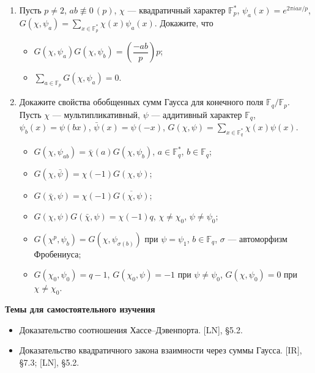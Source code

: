\documentclass[a4paper, 11pt]{article}
\begin{document}
\begin{enumerate}[topsep=0pt]
    \item Пусть $p\neq 2$, $ab\not\equiv 0\,(p)$, $\chi$ --- квадратичный характер $\mathbb{F}_p^*$, $\psi_a(x)=e^{2\pi i ax/p}$, $G(\chi,\psi_a)=\sum_{x\in\mathbb{F}_p^*}\chi(x)\psi_a(x)$. Докажите, что
    \begin{itemize}[topsep=0pt]
        \item $G(\chi,\psi_a)G(\chi,\psi_b) = \left(\dfrac{-ab}{p}\right) p$; %
        \item $\sum_{a\in\mathbb{F}_p} G(\chi,\psi_a)=0$. %
    \end{itemize}
    \item Докажите свойства обобщенных сумм Гаусса для конечного поля $\mathbb{F}_q/\mathbb{F}_p$. Пусть $\chi$ --- мультипликативный, $\psi$ --- аддитивный характер $\mathbb{F}_q$, $\psi_b(x)=\psi(bx)$, $\bar\psi(x)=\psi(-x)$, $G(\chi,\psi)=\sum_{x\in\mathbb{F}_q^*}\chi(x)\psi(x)$.
    \begin{itemize}[topsep=0pt]
        \item $G(\chi,\psi_{ab})=\bar{\chi}(a) G(\chi, \psi_b)$, $a\in\mathbb{F}_q^*$, $b\in \mathbb{F}_q$;
        \item $G(\chi,\bar{\psi}) = \chi(-1) G(\chi,\psi)$;
        \item $G(\bar{\chi},\psi) = \chi(-1) \overline{G(\chi,\psi)}$;
        \item $G(\chi,\psi)G(\bar{\chi},\psi)=\chi(-1) q$, $\chi\neq\chi_0$, $\psi\neq\psi_0$;
        \item $G(\chi^p,\psi_b)=G(\chi,\psi_{\sigma(b)})$ при $\psi=\psi_1$, $b\in\mathbb{F}_q$, $\sigma$ --- автоморфизм Фробениуса;
        \item $G(\chi_0,\psi_0)=q-1$, $G(\chi_0,\psi)=-1$ при $\psi\neq\psi_0$, $G(\chi,\psi_0)=0$ при $\chi\neq\chi_0$.
    \end{itemize} %
\end{enumerate}


\noindent\textbf{Темы для самостоятельного изучения}
\begin{itemize}[topsep=0pt]
    \item Доказательство соотношения Хассе--Дэвенпорта. [LN], \S 5.2.
    \item Доказательство квадратичного закона взаимности через суммы Гаусса. [IR], \S 7.3; [LN], \S 5.2.
\end{itemize}
\end{document}

